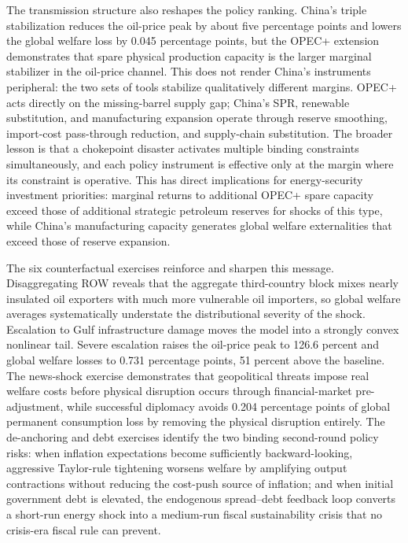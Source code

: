 \documentclass[12pt]{article}
\begin{document}
The transmission structure also reshapes the policy ranking. China's triple stabilization reduces the oil-price peak by about five percentage points and lowers the global welfare loss by 0.045 percentage points, but the OPEC+ extension demonstrates that spare physical production capacity is the larger marginal stabilizer in the oil-price channel. This does not render China's instruments peripheral: the two sets of tools stabilize qualitatively different margins. OPEC+ acts directly on the missing-barrel supply gap; China's SPR, renewable substitution, and manufacturing expansion operate through reserve smoothing, import-cost pass-through reduction, and supply-chain substitution. The broader lesson is that a chokepoint disaster activates multiple binding constraints simultaneously, and each policy instrument is effective only at the margin where its constraint is operative. This has direct implications for energy-security investment priorities: marginal returns to additional OPEC+ spare capacity exceed those of additional strategic petroleum reserves for shocks of this type, while China's manufacturing capacity generates global welfare externalities that exceed those of reserve expansion.

The six counterfactual exercises reinforce and sharpen this message. Disaggregating ROW reveals that the aggregate third-country block mixes nearly insulated oil exporters with much more vulnerable oil importers, so global welfare averages systematically understate the distributional severity of the shock. Escalation to Gulf infrastructure damage moves the model into a strongly convex nonlinear tail. Severe escalation raises the oil-price peak to 126.6 percent and global welfare losses to 0.731 percentage points, 51 percent above the baseline. The news-shock exercise demonstrates that geopolitical threats impose real welfare costs before physical disruption occurs through financial-market pre-adjustment, while successful diplomacy avoids 0.204 percentage points of global permanent consumption loss by removing the physical disruption entirely. The de-anchoring and debt exercises identify the two binding second-round policy risks: when inflation expectations become sufficiently backward-looking, aggressive Taylor-rule tightening worsens welfare by amplifying output contractions without reducing the cost-push source of inflation; and when initial government debt is elevated, the endogenous spread--debt feedback loop converts a short-run energy shock into a medium-run fiscal sustainability crisis that no crisis-era fiscal rule can prevent.
\end{document}
